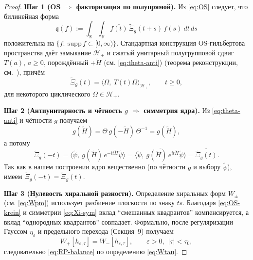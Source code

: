\documentclass{article}
\numberwithin{equation}{section}
\theoremstyle{plain}
\theoremstyle{definition}
\theoremstyle{remark}
\def\Rightarrow{⇒}%
\def\eta{η}\def\mu{μ}\def\nu{ν}\def\lambda{λ}\def\Lambda{Λ}%
\def\infty{∞}\def\partial{∂}\def\sum{Σ}\def\int{∫}%
\begin{document}
\begin{proof}
\textbf{Шаг 1 (OS $\Rightarrow$ факторизация по полупрямой).}
Из \eqref{eq:OS} следует, что билинейная форма
\begin{equation}
\label{eq:OS-form}
\mathfrak q(f):=\int_{\mathbb R}\!\!\int_{\mathbb R} 
\overline{f(t)}\,\widetilde\Xi_g(t+s)\,f(s)\ dt\,ds
\end{equation}
положительна на $\{f:\ \mathrm{supp}\,f\subset[0,\infty)\}$.
Стандартная конструкция OS-гильбертова пространства даёт замыкание $\mathcal H_+$ и сжатый унитарный полугрупповой сдвиг $T(a)$, $a\ge 0$, 
порождённый $+\widetilde H$ (см. \eqref{eq:theta-anti}) (теорема реконструкции, см.~\cite{GlimmJaffe1987}), причём
\begin{equation}
\label{eq:OS-krein}
\widetilde\Xi_g(t)=\langle \Omega,\ T(t)\Omega\rangle_{\mathcal H_+},\qquad t\ge 0,
\end{equation}
для некоторого циклического $\Omega\in\mathcal H_+$.

\textbf{Шаг 2 (Антиунитарность и чётность $g$ $\Rightarrow$ симметрия ядра).}
Из \eqref{eq:theta-anti} и чётности $g$ получаем
\begin{equation}
g(\widetilde H)=\Theta\,g(-\widetilde H)\,\Theta^{-1}=g(\widetilde H),
\end{equation}
а потому
\begin{equation}
\label{eq:Xi-sym}
\widetilde\Xi_g(-t)
=\langle \widetilde\psi,\ g(\widetilde H)\,e^{-it\widetilde H}\widetilde\psi\rangle
=\overline{\langle \widetilde\psi,\ g(\widetilde H)\,e^{it\widetilde H}\widetilde\psi\rangle}
=\overline{\widetilde\Xi_g(t)}.
\end{equation}
Так как в нашем построении ядро вещественно (по чётности $g$ и выбору $\widetilde\psi$), имеем $\widetilde\Xi_g(-t)=\widetilde\Xi_g(t)$.

\textbf{Шаг 3 (Нулевость хиральной разности).}
Определение хиральных форм $W_\pm$ (см. \eqref{eq:Wpm}) использует разбиение плоскости по знаку $ts$.
Благодаря \eqref{eq:OS-krein} и симметрии \eqref{eq:Xi-sym} вклад ``смешанных квадрантов'' компенсируется, а вклад ``однородных квадрантов'' совпадает.
Формально, после регуляризации Гауссом $\eta_\varepsilon$ и предельного перехода (Секция~9) получаем
\begin{equation}
W_+[h_{\varepsilon,\tau}]=W_-[h_{\varepsilon,\tau}],\qquad \varepsilon>0,\ \ |\tau|<\tau_0,
\end{equation}
следовательно \eqref{eq:RP-balance} по определению \eqref{eq:Wtau}.
\end{proof}
\end{document}
